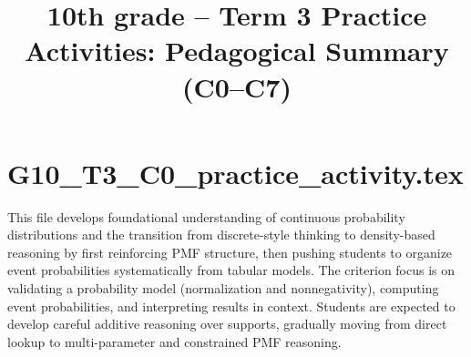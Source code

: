 


\title{10th grade -- Term 3 Practice Activities: Pedagogical Summary (C0--C7)}
\author{}
\date{}




\maketitle

\setcounter{tocdepth}{1}
\setcounter{secnumdepth}{2}
\tableofcontents


\section{G10\_T3\_C0\_practice\_activity.tex}
This file develops foundational understanding of continuous probability distributions and the transition from discrete-style thinking to density-based reasoning by first reinforcing PMF structure, then pushing students to organize event probabilities systematically from tabular models. The criterion focus is on validating a probability model (normalization and nonnegativity), computing event probabilities, and interpreting results in context. Students are expected to develop careful additive reasoning over supports, gradually moving from direct lookup to multi-parameter and constrained PMF reasoning.

